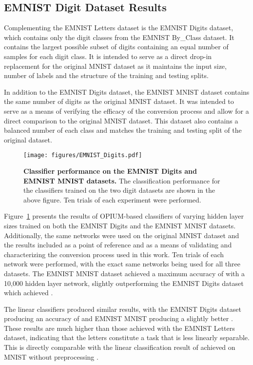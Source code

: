 \documentclass[conference]{IEEEtran}
\begin{document}
\subsection{EMNIST Digit Dataset Results}
\label{sec:results-emnist-digits}

Complementing the EMNIST Letters dataset is the EMNIST Digits dataset, which contains only the digit classes from the EMNIST By\_Class dataset. It contains the largest possible subset of digits containing an equal number of samples for each digit class. It is intended to serve as a direct drop-in replacement for the original MNIST dataset as it maintains the input size, number of labels and the structure of the training and testing splits.

In addition to the EMNIST Digits dataset, the EMNIST MNIST dataset contains the same number of digits as the original MNIST dataset. It was intended to serve as a means of verifying the efficacy of the conversion process and allow for a direct comparison to the original MNIST dataset. This dataset also contains a balanced number of each class and matches the training and testing split of the original dataset.

\begin{figure}
  \centering
  \texttt{[image: figures/EMNIST\_Digits.pdf]}
  \caption{\textbf{Classifier performance on the EMNIST Digits and EMNIST MNIST datasets.} The classification performance for the classifiers trained on the two digit datasets are shown in the above figure. Ten trials of each experiment were performed. }
  \label{fig:results-emnist-digits-performance}
\end{figure}

Figure~\ref{fig:results-emnist-digits-performance} presents the results of  OPIUM-based classifiers of varying hidden layer sizes trained on both the EMNIST Digits and the EMNIST MNIST datasets. Additionally, the same networks were used on the original MNIST dataset and the results included as a point of reference and as a means of validating and characterizing the conversion process used in this work. Ten trials of each network were performed, with the exact same networks being used for all three datasets. The EMNIST MNIST dataset achieved a maximum accuracy of  with a 10,000 hidden layer network, slightly outperforming the EMNIST Digits dataset which achieved .

The linear classifiers produced similar results, with the EMNIST Digits dataset producing an accuracy of  and EMNIST MNIST producing a slightly better . These results are much higher than those achieved with the EMNIST Letters dataset, indicating that the letters constitute a task that is less linearly separable. This is directly comparable with the linear classification result of  achieved on MNIST without preprocessing \cite{LeCun1998}.
\end{document}
